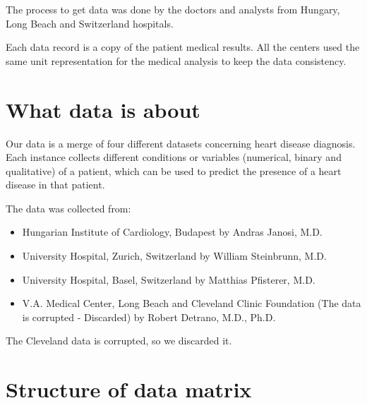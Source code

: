 \documentclass[a4paper,12pt]{article}
\begin{document}
    The process to get data was done by the doctors and analysts from Hungary, Long Beach and Switzerland hospitals.
    
    Each data record is a copy of the patient medical results. All the centers used the same unit representation for the medical analysis to keep the data consistency.

\section{What data is about}

    Our data is a merge of four different datasets concerning heart disease diagnosis.
    Each instance collects different conditions or variables (numerical, binary and qualitative) of a patient,
    which can be used to predict the presence of a heart disease in that patient.
    
    The data was collected from:

    \begin{itemize}

        \item Hungarian Institute of Cardiology, Budapest by Andras Janosi, M.D.
        \item University Hospital, Zurich, Switzerland by William Steinbrunn, M.D.
        \item University Hospital, Basel, Switzerland by Matthias Pfisterer, M.D.
        \item V.A. Medical Center, Long Beach and Cleveland Clinic Foundation (The data is corrupted - Discarded) by Robert Detrano, M.D., Ph.D.

    \end{itemize}

    The Cleveland data is corrupted, so we discarded it.

\section{Structure of data matrix}
\end{document}
